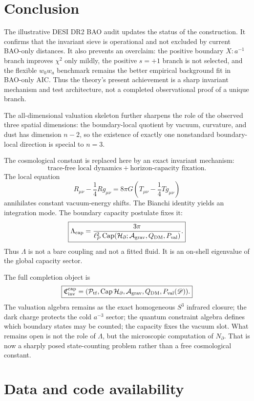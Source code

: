 \documentclass[aps,prd,reprint,nofootinbib,superscriptaddress]{revtex4-2}
\numberwithin{equation}{section}
\theoremstyle{definition}
\theoremstyle{plain}
\newcommand{\Dil}{\mathscr D}
\newcommand{\Agrav}{\mathcal A_{\rm grav}}
\newcommand{\Cinv}{\mathfrak C_{\rm inv}}
\newcommand{\Ncap}{N_{\partial}}
\newcommand{\Capacity}{\operatorname{Cap}}
\newcommand{\Ptr}{\mathcal P_{\rm tf}}
\begin{document}
\section{Conclusion}

The illustrative DESI DR2 BAO audit updates the status of the construction.  It confirms that the invariant sieve is operational and not excluded by current BAO-only distances.  It also prevents an overclaim: the positive boundary \(X:a^{-1}\) branch improves \(\chi^2\) only mildly, the positive \(s=+1\) branch is not selected, and the flexible \(w_0w_a\) benchmark remains the better empirical background fit in BAO-only AIC.  Thus the theory's present achievement is a sharp invariant mechanism and test architecture, not a completed observational proof of a unique branch.


The all-dimensional valuation skeleton further sharpens the role of the observed
three spatial dimensions: the boundary-local quotient by vacuum, curvature, and
dust has dimension \(n-2\), so the existence of exactly one nonstandard
boundary-local direction is special to \(n=3\).


The cosmological constant is replaced here by an exact invariant mechanism:
\begin{equation}
\boxed{
\text{trace-free local dynamics}
+
\text{horizon-capacity fixation}.
}
\end{equation}
The local equation
\[
R_{\mu\nu}-\frac14Rg_{\mu\nu}
=
8\pi G\left(T_{\mu\nu}-\frac14Tg_{\mu\nu}\right)
\]
annihilates constant vacuum-energy shifts.  The Bianchi identity yields an integration mode.  The boundary capacity postulate fixes it:
\[
\boxed{
\Lambda_{\rm cap}
=
\frac{3\pi}
{\ell_P^2\Capacity(\mathcal H_\partial;\Agrav,Q_{\rm DM},P_{\rm val})}.
}
\]
Thus \(\Lambda\) is not a bare coupling and not a fitted fluid.  It is an on-shell eigenvalue of the global capacity sector.

The full completion object is
\[
\boxed{
\Cinv^{\rm cap}
=
(\Ptr,\Capacity\mathcal H_\partial,\Agrav,Q_{\rm DM},P_{\rm val}(\Dil)).
}
\]
The valuation algebra remains as the exact homogeneous \(S^3\) infrared closure; the dark charge protects the cold \(a^{-3}\) sector; the quantum constraint algebra defines which boundary states may be counted; the capacity fixes the vacuum slot.  What remains open is not the role of \(\Lambda\), but the microscopic computation of \(\Ncap\).  That is now a sharply posed state-counting problem rather than a free cosmological constant.

\section*{Data and code availability}
\end{document}
